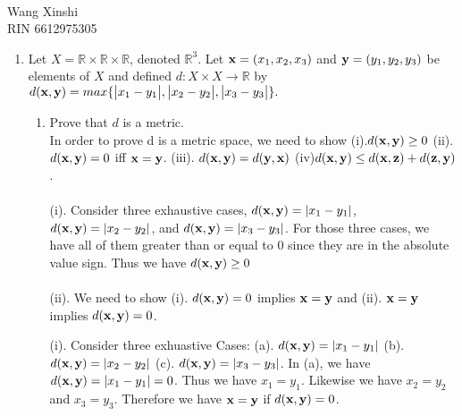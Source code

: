 \documentclass{article}
\begin{document}
\\
Wang Xinshi\\
RIN 6612975305\\


\begin{enumerate}
\item Let $X = \mathbb{R} \times \mathbb{R} \times \mathbb{R}$, denoted $\mathbb{R}^3$. 
Let ${\bf x}=(x_1,x_2,x_3) $ and ${\bf y} = (y_1,y_2,y_3)$ be elements of $X$ and defined $d: X \times X \to \mathbb{R}$ by $d({\bf x},{\bf y}) =  max\{\big|x_1-y_1\big|,\big|x_2-y_2\big|,\big|x_3-y_3\big|\}.$
\begin{enumerate}
\item Prove that $d$ is a metric.\\
In order to prove d is a metric space, we need to show (i).$d({\bf x},{\bf y}) \geq 0$ (ii).$d({\bf x},{\bf y}) = 0$ iff ${\bf x}={\bf y}$. (iii). $d({\bf x},{\bf y}) = d({\bf y},{\bf x})$ (iv)$d({\bf x},{\bf y}) \leq d({\bf x},{\bf z})+d({\bf z},{\bf y})$.\\\\ 
(i). Consider three exhaustive cases, $d({\bf x},{\bf y}) = |x_1-y_1|$, $d({\bf x},{\bf y}) = |x_2-y_2|$, and $d({\bf x},{\bf y}) = |x_3-y_3|$. For those three cases, we have all of them greater than or equal to 0 since they are in the absolute value sign. Thus we have $d({\bf x},{\bf y}) \geq 0$\\\\
(ii). We need to show (i). $d({\bf x},{\bf y}) = 0$ implies ${\bf x}={\bf y}$ and (ii). ${\bf x}={\bf y}$ implies $d({\bf x},{\bf y}) = 0$. 

\qquad (i). Consider three exhuastive Cases: (a). $d({\bf x},{\bf y}) = |x_1 - y_1|$ (b). $d({\bf x},{\bf y}) = |x_2 - y_2|$ (c). $d({\bf x},{\bf y}) = |x_3 - y_3|$. In (a), we have  $d({\bf x},{\bf y}) = |x_1 - y_1| = 0$. Thus we have $x_1 = y_1$. Likewise we have $x_2 = y_2$ and $x_3 = y_3$. Therefore we have ${\bf x}={\bf y}$ if $d({\bf x},{\bf y}) = 0$.


\end{enumerate}
\end{enumerate}
\end{document}
